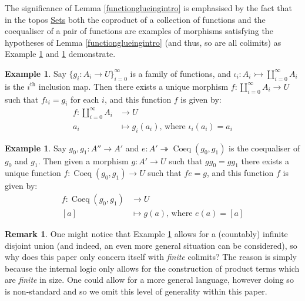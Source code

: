 \documentclass{birkjour}
\theoremstyle{plain}
\theoremstyle{definition}
\newtheorem{remark}[thm]{Remark}
\newtheorem{example}[thm]{Example}
\begin{document}
The significance of Lemma \ref{functionglueingintro} is emphasised by the fact that in the topos \underline{Sets} both the coproduct of a collection of functions and the coequaliser of a pair of functions are examples of morphisms satisfying the hypotheses of Lemma \ref{functionglueingintro} (and thus, so are all colimits) as Example \ref{ex:coproduct} and \ref{ex:coequaliser} demonstrate.
\begin{example}
	\label{ex:coproduct}
	Say $\lbrace g_i: A_i \to U\rbrace_{i = 0}^\infty$ is a family of functions, and $\iota_i: A_i \rightarrowtail \coprod_{i = 0}^\infty A_i$ is the $i^\text{th}$ inclusion map. Then there exists a unique morphism $f: \coprod_{i = 0}^\infty A_i \to U$ such that $f\iota_i = g_i$ for each $i$, and this function $f$ is given by:
	\begin{align*}
		f: \coprod_{i = 0}^\infty A_i &\to U\\
		a_i &\mapsto
		g_i(a_i)\text{, where }\iota_i(a_i) = a_i
	\end{align*}
\end{example}
\begin{example}\label{ex:coequaliser}
	Say $g_0,g_1: A'' \to A'$ and $e: A' \twoheadrightarrow  \operatorname{Coeq}(g_0,g_1)$ is the coequaliser of $g_0$ and $g_1$. Then given a morphism $g:A' \to U$ such that $g g_0 = g g_1$ there exists a unique function $f: \operatorname{Coeq}(g_0,g_1) \to U$ such that $fe = g$, and this function $f$ is given by:
	\begin{align*}
		f: \operatorname{Coeq}(g_0,g_1) &\to U\\
		[a] &\mapsto g(a)\text{, where }e(a) = [a]
	\end{align*}
\end{example}
\begin{remark}
	One might notice that Example \ref{ex:coproduct} allows for a (countably) infinite disjoint union (and indeed, an even more general situation can be considered), so why does this paper only concern itself with \emph{finite} colimits? The reason is simply because the internal logic only allows for the construction of product terms which are \emph{finite} in size. One could allow for a more general language, however doing so is non-standard and so we omit this level of generality within this paper.
\end{remark}
\end{document}
